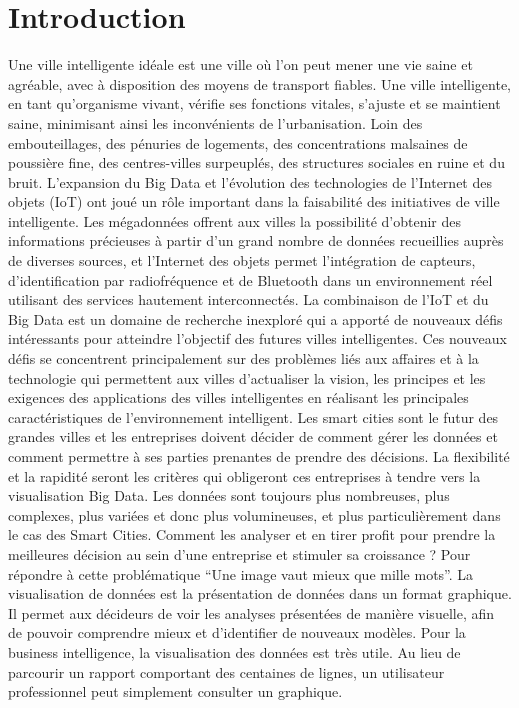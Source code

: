 \documentclass[french, a4paper, 12pt]{report}
\begin{document}
\chapter{Introduction}
Une ville intelligente idéale est une ville où l’on peut mener une vie saine et agréable, avec à disposition des moyens de transport fiables. Une ville intelligente, en tant qu’organisme vivant, vérifie ses fonctions vitales, s’ajuste et se maintient saine, minimisant ainsi les inconvénients de l’urbanisation. Loin des embouteillages, des pénuries de logements, des concentrations malsaines de poussière fine, des centres-villes surpeuplés, des structures sociales en ruine et du bruit.
L'expansion du Big Data et l'évolution des technologies de l'Internet des objets (IoT) ont joué un rôle important dans la faisabilité des initiatives de ville intelligente. Les mégadonnées offrent aux villes la possibilité d’obtenir des informations précieuses à partir d’un grand nombre de données recueillies auprès de diverses sources, et l’Internet des objets permet l’intégration de capteurs, d’identification par radiofréquence et de Bluetooth dans un environnement réel utilisant des services hautement interconnectés. La combinaison de l'IoT  et du Big Data est un domaine de recherche inexploré qui a apporté de nouveaux défis intéressants pour atteindre l'objectif des futures villes intelligentes. Ces nouveaux défis se concentrent principalement sur des problèmes liés aux affaires et à la technologie qui permettent aux villes d’actualiser la vision, les principes et les exigences des applications des villes intelligentes en réalisant les principales caractéristiques de l’environnement intelligent.
Les smart cities sont le futur des grandes villes et les entreprises doivent décider de comment gérer les données et comment permettre à ses parties prenantes de prendre des décisions. La flexibilité et la rapidité seront les critères qui obligeront ces entreprises à tendre vers la visualisation Big Data.
Les données sont toujours plus nombreuses, plus complexes, plus variées et donc plus volumineuses, et plus particulièrement dans le cas des Smart Cities. 
Comment les analyser et en tirer profit pour prendre la meilleures décision au sein d’une entreprise et stimuler sa croissance ? Pour répondre à cette problématique “Une image vaut mieux que mille mots”.
La visualisation de données est la présentation de données dans un format graphique. Il permet aux décideurs de voir les analyses présentées de manière visuelle, afin de pouvoir comprendre mieux et d’identifier de nouveaux modèles. 
Pour la business intelligence, la visualisation des données est très utile. Au lieu de parcourir un rapport comportant des centaines de lignes, un utilisateur professionnel peut simplement consulter un graphique.
\end{document}
